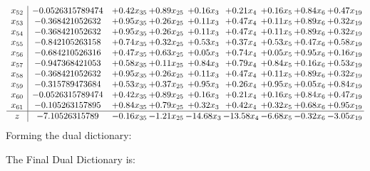 \documentclass[8pt]{article}
\begin{document}
\[\begin{array}{c| c c@{\hskip 2pt} c@{\hskip 2pt} c@{\hskip 2pt} c@{\hskip 2pt} c@{\hskip 2pt} c@{\hskip 2pt} c@{\hskip 2pt} }
 x_{52}   &  -0.0526315789474 & +  0.42 x_{35} & +  0.89 x_{25} & +  0.16 x_{3} & +  0.21 x_{4} & +  0.16 x_{5} & +  0.84 x_{6} & +  0.47 x_{19}\\
 x_{53}   &  -0.368421052632 & +  0.95 x_{35} & +  0.26 x_{25} & +  0.11 x_{3} & +  0.47 x_{4} & +  0.11 x_{5} & +  0.89 x_{6} & +  0.32 x_{19}\\
 x_{54}   &  -0.368421052632 & +  0.95 x_{35} & +  0.26 x_{25} & +  0.11 x_{3} & +  0.47 x_{4} & +  0.11 x_{5} & +  0.89 x_{6} & +  0.32 x_{19}\\
 x_{55}   &  -0.842105263158 & +  0.74 x_{35} & +  0.32 x_{25} & +  0.53 x_{3} & +  0.37 x_{4} & +  0.53 x_{5} & +  0.47 x_{6} & +  0.58 x_{19}\\
 x_{56}   &  -0.684210526316 & +  0.47 x_{35} & +  0.63 x_{25} & +  0.05 x_{3} & +  0.74 x_{4} & +  0.05 x_{5} & +  0.95 x_{6} & +  0.16 x_{19}\\
 x_{57}   &  -0.947368421053 & +  0.58 x_{35} & +  0.11 x_{25} & +  0.84 x_{3} & +  0.79 x_{4} & +  0.84 x_{5} & +  0.16 x_{6} & +  0.53 x_{19}\\
 x_{58}   &  -0.368421052632 & +  0.95 x_{35} & +  0.26 x_{25} & +  0.11 x_{3} & +  0.47 x_{4} & +  0.11 x_{5} & +  0.89 x_{6} & +  0.32 x_{19}\\
 x_{59}   &  -0.315789473684 & +  0.53 x_{35} & +  0.37 x_{25} & +  0.95 x_{3} & +  0.26 x_{4} & +  0.95 x_{5} & +  0.05 x_{6} & +  0.84 x_{19}\\
 x_{60}   &  -0.0526315789474 & +  0.42 x_{35} & +  0.89 x_{25} & +  0.16 x_{3} & +  0.21 x_{4} & +  0.16 x_{5} & +  0.84 x_{6} & +  0.47 x_{19}\\
 x_{61}   &  -0.105263157895 & +  0.84 x_{35} & +  0.79 x_{25} & +  0.32 x_{3} & +  0.42 x_{4} & +  0.32 x_{5} & +  0.68 x_{6} & +  0.95 x_{19}\\
\hline
z    &  -7.10526315789 & -0.16 x_{35} & -1.21 x_{25} & -14.68 x_{3} & -13.58 x_{4} & -6.68 x_{5} & -0.32 x_{6} & -3.05 x_{19}\\
\end{array}\]
Forming the dual dictionary:

The Final Dual Dictionary is: 
\end{document}
